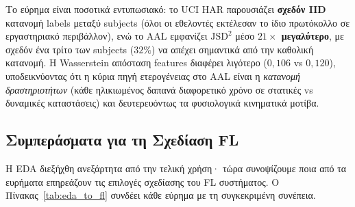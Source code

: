 Το εύρημα είναι ποσοτικά εντυπωσιακό: το UCI HAR παρουσιάζει
\textbf{σχεδόν IID} κατανομή labels μεταξύ subjects (όλοι οι
εθελοντές εκτέλεσαν το ίδιο πρωτόκολλο σε εργαστηριακό
περιβάλλον), ενώ το AAL εμφανίζει $\text{JSD}^2$ μέσο
\textbf{$21\times$ μεγαλύτερο}, με σχεδόν ένα τρίτο των subjects
($32\%$) να απέχει σημαντικά από την καθολική κατανομή. Η
Wasserstein απόσταση features διαφέρει λιγότερο ($0{,}106$ vs
$0{,}120$), υποδεικνύοντας ότι η κύρια πηγή ετερογένειας στο AAL
είναι η \textit{κατανομή δραστηριοτήτων} (κάθε ηλικιωμένος
δαπανά διαφορετικό χρόνο σε στατικές vs δυναμικές καταστάσεις)
και δευτερευόντως τα φυσιολογικά κινηματικά μοτίβα.

\subsection{Συμπεράσματα για τη Σχεδίαση FL}
\label{subsec:fl_implications}

Η EDA διεξήχθη ανεξάρτητα από την τελική χρήση· τώρα συνοψίζουμε
ποια από τα ευρήματα επηρεάζουν τις επιλογές σχεδίασης του FL
συστήματος. Ο Πίνακας~\ref{tab:eda_to_fl} συνδέει κάθε εύρημα
με τη συγκεκριμένη συνέπεια.

